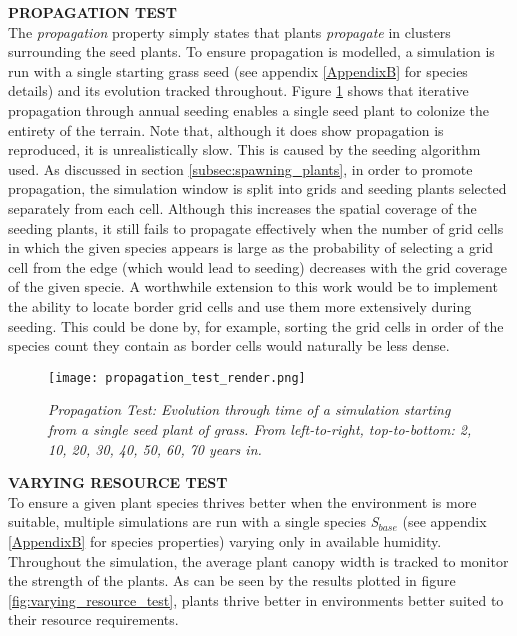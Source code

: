 \textbf{PROPAGATION TEST}\\

The \textit{propagation} property simply states that plants \textit{propagate} in clusters surrounding the seed plants. To ensure propagation is modelled, a simulation is run with a single starting grass seed (see appendix \ref{AppendixB} for species details) and its evolution tracked throughout. Figure \ref{fig:propagation_test_render} shows that iterative propagation through annual seeding enables a single seed plant to colonize the entirety of the terrain. Note that, although it does show propagation is reproduced, it is unrealistically slow. This is caused by the seeding algorithm used. As discussed in section \ref{subsec:spawning_plants}, in order to promote propagation, the simulation window is split into grids and seeding plants selected separately from each cell. Although this increases the spatial coverage of the seeding plants, it still fails to propagate effectively when the number of grid cells in which the given species appears is large as the probability of selecting a grid cell from the edge (which would lead to seeding) decreases with the grid coverage of the given specie. A worthwhile extension to this work would be to implement the ability to locate border grid cells and use them more extensively during seeding. This could be done by, for example, sorting the grid cells in order of the species count they contain as border cells would naturally be less dense. \\

\begin{figure}
\center
	\texttt{[image: propagation\_test\_render.png]}
	\caption{ \textit{Propagation Test: Evolution through time of a simulation starting from a single seed plant of grass. From left-to-right, top-to-bottom: 2, 10, 20, 30, 40, 50, 60, 70 years in.}}
	\label{fig:propagation_test_render}
\end{figure}

\textbf{VARYING RESOURCE TEST} \\

To ensure a given plant species thrives better when the environment is more suitable, multiple simulations are run with a single species \textit{S$_{base}$} (see appendix \ref{AppendixB} for species properties) varying only in available humidity. Throughout the simulation, the average plant canopy width is tracked to monitor the strength of the plants. As can be seen by the results plotted in figure \ref{fig:varying_resource_test}, plants thrive better in environments better suited to their resource requirements.\\

